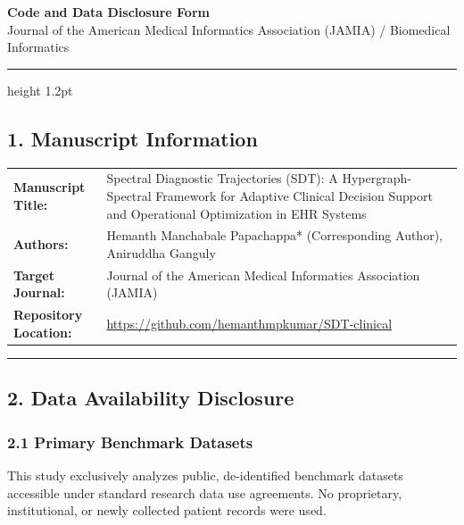 \documentclass[10pt, letterpaper]{article}
\begin{document}
\begin{center}
    {\Large \textbf{Code and Data Disclosure Form}}\\[2pt]
    {\normalsize Journal of the American Medical Informatics Association (JAMIA) / Biomedical Informatics}
\end{center}

\vspace{-6pt}
\hrule height 1.2pt
\vspace{5pt}

\subsection*{1. Manuscript Information}

\begin{tabularx}{\textwidth}{@{}l X@{}}
    \textbf{Manuscript Title:} & Spectral Diagnostic Trajectories (SDT): A Hypergraph-Spectral Framework for Adaptive Clinical Decision Support and Operational Optimization in EHR Systems \\
    \addlinespace[2pt]
    \textbf{Authors:} & Hemanth Manchabale Papachappa* (Corresponding Author), Aniruddha Ganguly \\
    \addlinespace[2pt]
    \textbf{Target Journal:} & Journal of the American Medical Informatics Association (JAMIA) \\
    \addlinespace[2pt]
    \textbf{Repository Location:} & \url{https://github.com/hemanthmpkumar/SDT-clinical} \\
\end{tabularx}

\vspace{3pt}
\hrule
\vspace{3pt}

\subsection*{2. Data Availability Disclosure}

\subsubsection*{2.1 Primary Benchmark Datasets}
This study exclusively analyzes public, de-identified benchmark datasets accessible under standard research data use agreements. No proprietary, institutional, or newly collected patient records were used.
\end{document}
